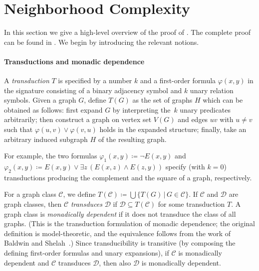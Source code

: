 \documentclass[11pt]{article}
\theoremstyle{definition}
\newcommand{\CC}{{\mathscr C}}
\newcommand{\DD}{{\mathscr D}}
\newcommand{\szym}[1]{\todo[color=blue!40]{Szymon: #1}}
\newcommand{\szymin}[1]{\begin{szin}#1\end{szin}}
\newcommand{\set}[1]{\{#1\}}
\newcommand{\setof}[2]{\set{#1 \,|\, #2 }}
\let\phi\varphi
\begin{document}


\section{Neighborhood Complexity}
\label{sec:neighborhoodComplexity}

In this section we give a high-level overview of the proof of . The complete proof can be found in . We begin by introducing the relevant notions. 

\paragraph{Transductions and monadic dependence}
\label{sec:prelims}


A \emph{transduction} $T$ is specified by a number $k$ and a first-order formula $\phi(x,y)$ in the signature consisting of a binary adjacency symbol and $k$ unary relation symbols.
Given a graph $G$, define $T(G)$ as the set of graphs $H$ which can be obtained as follows: first expand $G$ by interpreting the~$k$ unary predicates arbitrarily; then construct a graph on vertex set $V(G)$ and edges $uv$ with $u\neq v$ such that $\phi(u,v)\lor\phi(v,u)$ holds in the expanded structure; finally, take an arbitrary induced subgraph $H$ of the resulting graph.

For example, the two formulas
$\phi_1(x,y) \coloneqq \neg E(x,y)$ and 
$\phi_2(x,y) \coloneqq E(x,y) \vee \exists z\,(E(x,z) \wedge E(z,y))$
specify (with $k=0$) transductions producing the complement and the square of a graph, respectively.

For a graph class $\CC$, we define $T(\CC)\coloneqq \bigcup \setof{T(G)}{G\in\CC}$.
If $\CC$ and $\DD$ are graph classes, then $\CC$ \emph{transduces} $\DD$ if $\DD\subseteq T(\CC)$ for some transduction $T$. A graph class is \emph{monadically dependent} if it does not transduce the class of all graphs. 
(This is the transduction formulation of monadic dependence; the original definition is model-theoretic, and the equivalence follows from the work of Baldwin and Shelah~\cite{baldwin1985second}.)
Since transducibility is transitive (by composing the defining first-order formulas and unary expansions), if $\CC$ is monadically dependent and $\CC$ transduces $\DD$, then also $\DD$ is monadically dependent. 
\end{document}
